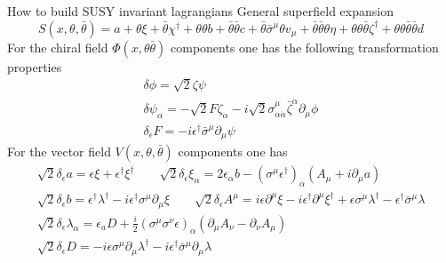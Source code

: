 \documentclass[10pt]{beamer}
\begin{document}
\begin{frame}{How to build SUSY invariant lagrangians}
General superfield expansion
\begin{equation*}
    S\left(x, \theta, \bar\theta\right)=a+\theta \xi+\bar\theta \chi^{\dagger}+\theta \theta b+\bar\theta \bar\theta c+\bar\theta \bar{\sigma}^{\mu} \theta v_{\mu}+\bar\theta \bar\theta \theta \eta+\theta \theta \bar\theta \zeta^{\dagger}+\theta \theta \bar\theta \bar\theta d
\end{equation*}
For the chiral field $\Phi(x, \theta \bar\theta)$ components one has the following transformation properties
\begin{gather*}
    \delta\phi = \sqrt{2} \zeta \psi \\
    \delta\psi_\alpha = -\sqrt{2}F\zeta_{\alpha} - i \sqrt{2} \sigma^{\mu}_{\alpha \dot\alpha} \bar\zeta^{\dot \alpha} \partial_\mu \phi \\
    \boxed{\delta_{\epsilon} F = -i\epsilon^{\dagger} \bar\sigma^\mu \partial_\mu \psi}
\end{gather*}
For the vector field $V(x, \theta, \bar\theta)$ components one has
\begin{gather*}
        \sqrt{2} \delta_{\epsilon} a =\epsilon \xi+\epsilon^{\dagger} \xi^{\dagger} \qquad 
        \sqrt{2} \delta_{\epsilon} \xi_{\alpha} =2 \epsilon_{\alpha} b-\left(\sigma^{\mu} \epsilon^{\dagger}\right)_{\alpha}\left(A_{\mu}+i \partial_{\mu} a\right) \\
        \sqrt{2} \delta_{\epsilon} b =\epsilon^{\dagger} \lambda^{\dagger}-i \epsilon^{\dagger} \sigma^{\mu} \partial_{\mu} \xi \qquad
        \sqrt{2} \delta_{\epsilon} A^{\mu} =i \epsilon \partial^{\mu} \xi-i \epsilon^{\dagger} \partial^{\mu} \xi^{\dagger}+\epsilon \sigma^{\mu} \lambda^{\dagger}-\epsilon^{\dagger} \bar{\sigma}^{\mu} \lambda \\
        \sqrt{2} \delta_{\epsilon} \lambda_{\alpha} =\epsilon_{a} D+\frac{i}{2}\left(\sigma^{\mu} \sigma^{\nu} \epsilon\right)_{\alpha}\left(\partial_{\mu} A_{\nu}-\partial_{\nu} A_{\mu}\right) \\
        \boxed{\sqrt{2} \delta_{\epsilon} D =-i \epsilon \sigma^{\mu} \partial_{\mu} \lambda^{\dagger}-i \epsilon^{\dagger} \bar{\sigma}^{\mu} \partial_{\mu} \lambda}
\end{gather*}
\end{frame}
\end{document}
